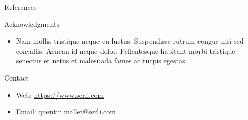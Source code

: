 \documentclass[final,hyperref={pdfpagelabels=false}]{beamer}
\begin{document}
\begin{frame}[t]
\begin{columns}[t]
\begin{column}{.465\textwidth}
\begin{block}{References}
        
\nocite{*} %
\small{
}

\end{block}


\begin{block}{Acknowledgments}

\begin{itemize}
\item Nam mollis tristique neque eu luctus. Suspendisse rutrum congue nisi sed convallis. Aenean id neque dolor. Pellentesque habitant morbi tristique senectus et netus et malesuada fames ac turpis egestas.
\end{itemize}

\end{block}



\begin{block}{Contact}

\begin{itemize}
\item Web: \href{https://www.serli.com}{https://www.serli.com}
\item Email: \href{mailto:quentin.mallet@serli.com}{quentin.mallet@serli.com}
\end{itemize}

\end{block}


\end{column} %

\begin{column}{.015\textwidth}\end{column} %

\end{columns} %

\end{frame} %
\end{document}
